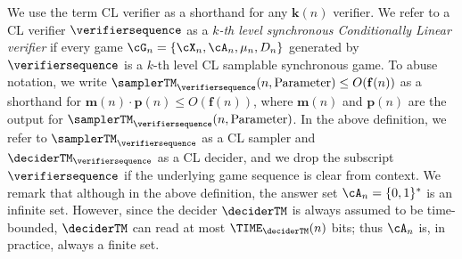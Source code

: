 We use the term CL verifier as a shorthand for any $\mathbf{k}(n)$ verifier. We refer to a CL verifier $\verifiersequence$ as a \textit{$k$-th level synchronous Conditionally Linear verifier} if every game $\cG_n = \{ \cX_n, \cA_n, \mu_n, D_n\}$ generated by $\verifiersequence$ is a $k$-th level CL samplable synchronous game. To abuse notation, we write $\samplerTM_{\verifiersequence}(n, \text{Parameter}) \leq O(\mathbf{f}(n))$ as a shorthand for $\mathbf{m}(n) \cdot \mathbf{p}(n) \leq O(\mathbf{f}(n))$, where $\mathbf{m}(n)$ and $\mathbf{p}(n)$ are the output for  $\samplerTM_{\verifiersequence}(n, \text{Parameter})$. In the above definition, we refer to $\samplerTM_{\verifiersequence}$ as a CL sampler and $\deciderTM_\verifiersequence$ as a CL decider, and we drop the subscript $\verifiersequence$ if the underlying game sequence is clear from context. We remark that although in the above definition, the answer set $\cA_n = \{0,1\}^*$ is an infinite set. However, since the decider $\deciderTM$ is always assumed to be time-bounded, $\deciderTM$ can read at most $\TIME_{\deciderTM}(n)$ bits; thus $\cA_n$ is, in practice, always a finite set. 

